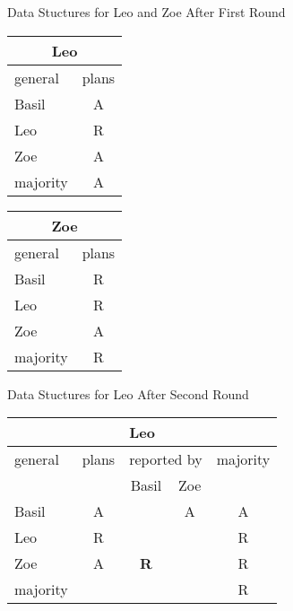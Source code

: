 \begin{wideslide}[bm=,toc=]{\large Data Stuctures for Leo and Zoe After First Round}
\begin{center}
\begin{paenv}
\begin{minipage}{.3\textwidth}
\begin{tabular}{|l|c|}
\hline
\multicolumn{2}{|c|}{Leo}\\\hline
general & plans \\\hline
Basil & A\\\hline
Leo & R \\\hline
Zoe & A \\\hline
majority &A\\\hline
\end{tabular}
\end{minipage}
\hspace{.1\textwidth}
\begin{minipage}{.3\textwidth}
\begin{tabular}{|l|c|}
\hline
\multicolumn{2}{|c|}{Zoe}\\\hline
general & plans \\\hline
Basil & R\\\hline
Leo & R \\\hline
Zoe & A \\\hline
majority &R\\\hline
\end{tabular}
\end{minipage}
\end{paenv}
\end{center}
\end{wideslide}

\begin{wideslide}[bm=,toc=]{\large Data Stuctures for Leo After Second Round}
\begin{center}
\begin{paenv}
\begin{tabular}{|l|c|c|c|c|}
\hline
\multicolumn{5}{|c|}{Leo}\\\hline
general & plans & \multicolumn{2}{|c|}{reported by} & majority \\\hline
 &  & Basil & Zoe & \\\hline
Basil & A &  & A& A \\\hline
Leo & R & & & R\\\hline
Zoe & A & \bfseries R&  & R\\\hline
majority &&&&R\\\hline
\end{tabular}
\end{paenv}
\end{center}
\end{wideslide}


